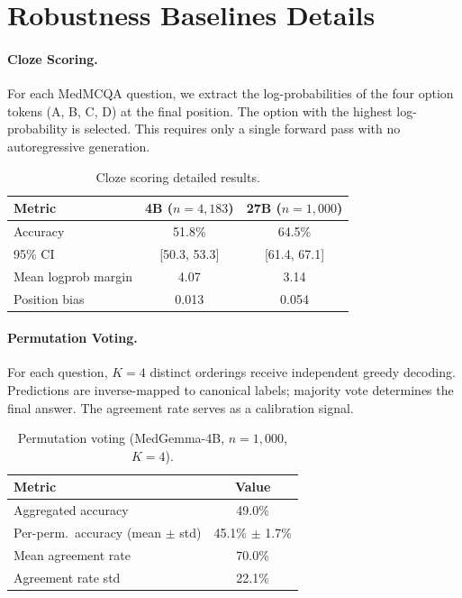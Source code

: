 \documentclass[runningheads,a4paper]{llncs}
\begin{document}
\section{Robustness Baselines Details}\label{app:baselines}

\paragraph{Cloze Scoring.}
For each MedMCQA question, we extract the log-probabilities of the four option tokens (A, B, C, D) at the final position. The option with the highest log-probability is selected. This requires only a single forward pass with no autoregressive generation.

\begin{table}[t]
\centering
\caption{Cloze scoring detailed results.}
\label{tab:cloze_detail}
\begin{tabular}{lcc}
\toprule
\textbf{Metric} & \textbf{4B ($n{=}4{,}183$)} & \textbf{27B ($n{=}1{,}000$)} \\
\midrule
Accuracy & 51.8\% & 64.5\% \\
95\% CI & [50.3, 53.3] & [61.4, 67.1] \\
Mean logprob margin & 4.07 & 3.14 \\
Position bias & 0.013 & 0.054 \\
\bottomrule
\end{tabular}
\end{table}

\paragraph{Permutation Voting.}
For each question, $K{=}4$ distinct orderings receive independent greedy decoding. Predictions are inverse-mapped to canonical labels; majority vote determines the final answer. The agreement rate serves as a calibration signal.

\begin{table}[t]
\centering
\caption{Permutation voting (MedGemma-4B, $n{=}1{,}000$, $K{=}4$).}
\label{tab:perm_vote_detail}
\begin{tabular}{lc}
\toprule
\textbf{Metric} & \textbf{Value} \\
\midrule
Aggregated accuracy & 49.0\% \\
Per-perm.\ accuracy (mean $\pm$ std) & 45.1\% $\pm$ 1.7\% \\
Mean agreement rate & 70.0\% \\
Agreement rate std & 22.1\% \\
\bottomrule
\end{tabular}
\end{table}
\end{document}
